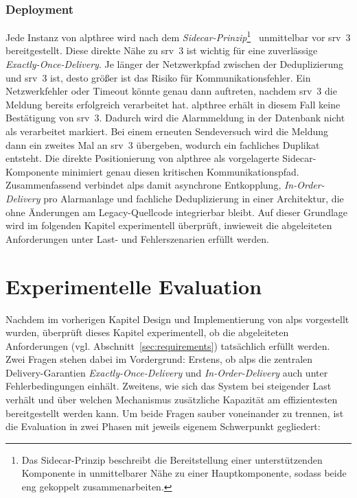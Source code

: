 \pagebreak
\subsection{Deployment}
Jede Instanz von \gls{alpthree} wird nach dem \textit{Sidecar-Prinzip}\footnote{Das Sidecar-Prinzip beschreibt die Bereitstellung einer unterstützenden Komponente in unmittelbarer Nähe zu einer Hauptkomponente, sodass beide eng gekoppelt zusammenarbeiten.}~\citep{burns2018designing} unmittelbar vor \gls{srv}~3 bereitgestellt. Diese direkte Nähe zu \gls{srv}~3 ist wichtig für eine zuverlässige \textit{Exactly-Once-Delivery}. Je länger der Netzwerkpfad zwischen der Deduplizierung und \gls{srv}~3 ist, desto größer ist das Risiko für Kommunikationsfehler. Ein Netzwerkfehler oder Timeout könnte genau dann auftreten, nachdem \gls{srv}~3 die Meldung bereits erfolgreich verarbeitet hat. \gls{alpthree} erhält in diesem Fall keine Bestätigung von \gls{srv}~3. Dadurch wird die Alarmmeldung in der Datenbank nicht als verarbeitet markiert. Bei einem erneuten Sendeversuch wird die Meldung dann ein zweites Mal an \gls{srv}~3 übergeben, wodurch ein fachliches Duplikat entsteht. Die direkte Positionierung von \gls{alpthree} als vorgelagerte Sidecar-Komponente minimiert genau diesen kritischen Kommunikationspfad.
Zusammenfassend verbindet \gls{alps} damit asynchrone Entkopplung, \textit{In-Order-Delivery} pro Alarmanlage und fachliche Deduplizierung in einer Architektur, die ohne Änderungen am Legacy-Quellcode integrierbar bleibt. Auf dieser Grundlage wird im folgenden Kapitel experimentell überprüft, inwieweit die abgeleiteten Anforderungen unter Last- und Fehlerszenarien erfüllt werden.

\chapter{Experimentelle Evaluation}
\label{ch:eval}

Nachdem im vorherigen Kapitel Design und Implementierung von \gls{alps} vorgestellt wurden, überprüft dieses Kapitel experimentell, ob die abgeleiteten Anforderungen (vgl. Abschnitt~\ref{sec:requirements}) tatsächlich erfüllt werden. Zwei Fragen stehen dabei im Vordergrund: Erstens, ob \gls{alps} die zentralen Delivery-Garantien \textit{Exactly-Once-Delivery} und \textit{In-Order-Delivery} auch unter Fehlerbedingungen einhält. Zweitens, wie sich das System bei steigender Last verhält und über welchen Mechanismus zusätzliche Kapazität am effizientesten bereitgestellt werden kann. Um beide Fragen sauber voneinander zu trennen, ist die Evaluation in zwei Phasen mit jeweils eigenem Schwerpunkt gegliedert:

